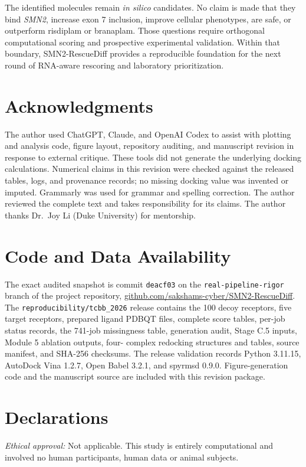 \documentclass[journal]{IEEEtran}
\begin{document}
The identified molecules remain \textit{in silico} candidates. No claim
is made that they bind \textit{SMN2}, increase exon 7 inclusion, improve
cellular phenotypes, are safe, or outperform risdiplam or branaplam.
Those questions require orthogonal computational scoring and prospective
experimental validation. Within that boundary, SMN2-RescueDiff provides
a reproducible foundation for the next round of RNA-aware rescoring and
laboratory prioritization.

\section*{Acknowledgments}
The author used ChatGPT, Claude, and OpenAI Codex to assist with plotting
and analysis code, figure layout, repository auditing, and manuscript
revision in response to external critique. These tools did not generate
the underlying docking calculations. Numerical claims in this revision
were checked against the released tables, logs, and provenance records;
no missing docking value was invented or imputed. Grammarly was used for
grammar and spelling correction. The author reviewed the complete text
and takes responsibility for its claims. The author thanks Dr.~Joy Li
(Duke University) for mentorship.

\section*{Code and Data Availability}
The exact audited snapshot is commit \texttt{deacf03} on the
\texttt{real-pipeline-rigor} branch of the project repository,
\url{github.com/sakshams-cyber/SMN2-RescueDiff}. The
\texttt{reproducibility/tcbb\_2026} release contains the 100 decoy
receptors, five target receptors, prepared ligand PDBQT files, complete
score tables, per-job status records, the 741-job missingness table,
generation audit, Stage C.5 inputs, Module 5 ablation outputs, four-
complex redocking structures and tables, source manifest, and SHA-256
checksums. The release validation records Python 3.11.15, AutoDock Vina
1.2.7, Open Babel 3.2.1, and spyrmsd 0.9.0. Figure-generation code and
the manuscript source are included with this revision package.

\section*{Declarations}
\textit{Ethical approval:} Not applicable. This study is entirely
computational and involved no human participants, human data or animal
subjects.
\end{document}
